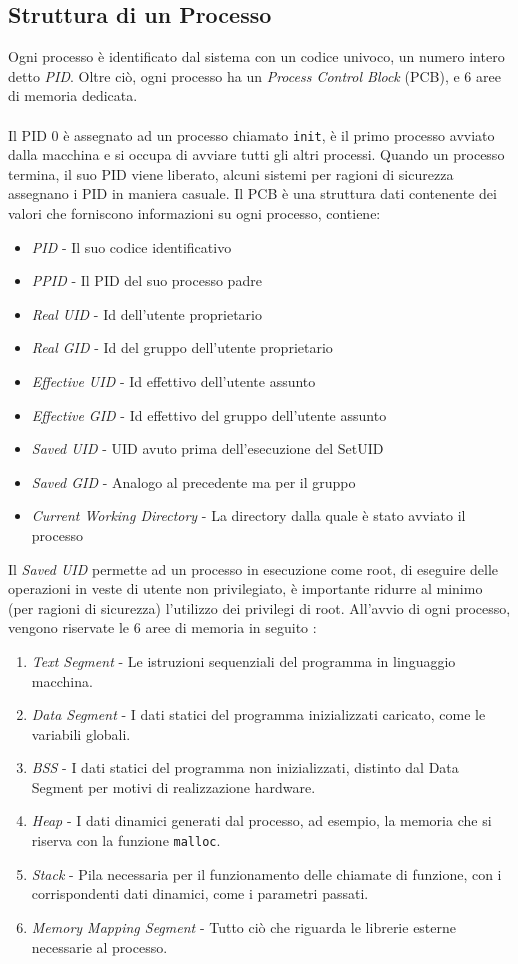 \documentclass[12pt, letterpaper]{article}
\newcommand{\code}[1]{\colorbox{light-gray}{\texttt{#1}}}
\newcommand{\acc}{\\\hphantom{}\\}
\begin{document}
\subsection{Struttura di un Processo}
Ogni processo è identificato dal sistema con un codice 
univoco, un numero intero detto \textit{PID}. Oltre ciò, 
ogni processo ha un \textit{Process Control Block} (PCB), e 
6 aree di memoria dedicata.\acc 
Il PID 0 è assegnato ad un processo chiamato 
\code{init}, è il primo processo avviato dalla macchina e 
si occupa di avviare tutti gli altri processi. Quando un 
processo termina, il suo PID viene liberato, alcuni sistemi per 
ragioni di sicurezza assegnano i PID in maniera casuale.
Il PCB è una struttura dati contenente dei valori che forniscono 
informazioni su ogni processo, contiene: \begin{itemize}
    \item \textit{PID} - Il suo codice identificativo 
    \item \textit{PPID} - Il PID del suo processo padre
    \item \textit{Real UID} - Id dell'utente proprietario 
    \item \textit{Real GID} - Id del gruppo dell'utente proprietario 
    \item \textit{Effective UID} - Id effettivo dell'utente assunto
    \item \textit{Effective GID} - Id effettivo del gruppo dell'utente assunto
    \item \textit{Saved UID} - UID avuto prima dell'esecuzione del SetUID
    \item \textit{Saved GID} - Analogo al precedente ma per il gruppo 
    \item \textit{Current Working Directory} - La directory dalla quale è stato avviato il processo
\end{itemize}
Il \textit{Saved UID} permette ad un processo in esecuzione come root, di eseguire delle operazioni in veste di utente 
non privilegiato, è importante ridurre al minimo (per ragioni di sicurezza) l'utilizzo dei privilegi di root. All'avvio di 
ogni processo, vengono riservate le 6 aree di memoria in seguito : \begin{enumerate}
    \item \textit{Text Segment} - Le istruzioni sequenziali del programma in linguaggio macchina.
    \item \textit{Data Segment} - I dati statici del programma inizializzati caricato, come le variabili globali.
    \item \textit{BSS} - I dati statici del programma non inizializzati, distinto dal Data Segment per motivi di realizzazione
    hardware.
    \item \textit{Heap} - I dati dinamici generati dal processo, ad esempio, la memoria che si riserva con la funzione \code{malloc}.
    \item \textit{Stack} - Pila necessaria per il funzionamento delle chiamate di funzione, con i corrispondenti dati dinamici, come 
    i parametri passati.
    \item \textit{Memory Mapping Segment} - Tutto ciò che riguarda le librerie esterne necessarie al processo.
\end{enumerate}
\end{document}
